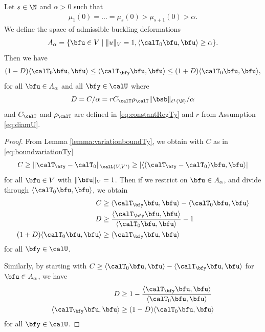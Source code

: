 \begin{lemma}\label{lemma:equivalenceTy}
    Let $ s \in \N$ and $\alpha > 0$ such that
    \begin{align*}
        \mu_1(0) = \ldots = \mu_s(0) > \mu_{s+1}(0) > \alpha.
    \end{align*}
We define the space of admissible buckling deformations 
\begin{align*}
A_{\alpha} = \{\bfu \in V  \mid \| u \|_V = 1, \langle \calT_0 \bfu, \bfu \rangle  \geq \alpha \}.   
\end{align*}
Then we have
\begin{align*}
    (1 - D) \langle \calT_0 \bfu, \bfu \rangle  \leq  \langle \calT_{\bfy} \bfu, \bfu \rangle  \leq  (1 + D) \langle \calT_0 \bfu, \bfu \rangle, 
\end{align*}
   for all $\bfu \in A_{\alpha}$ and all $\bfy \in \calU$ where 
   \begin{align}
   \label{eq:definitionD}
       D = C / \alpha = r C_{\calT} \rho_{\calT} \| \bsb \|_{\ell^1(\N)}/ \alpha 
   \end{align} and $C_{\calT} $ and $\rho_{\calT}$ are defined in \eqref{eq:constantRegTy} and $r$ from Assumption \eqref{eq:diamU}.
\end{lemma}
\begin{proof}
    From Lemma \ref{lemma:variationboundTy}, we obtain with $C$ as in \eqref{eq:boundvariationTy}
    \begin{align*}
        C \geq \| \calT_{\bfy} - \calT_0 \|_{\calL(V,V')} \geq \vert \langle (\calT_{\bfy} - \calT_0) \bfu, \bfu \rangle \vert
    \end{align*}
    for all $\bfu \in V$ with $ \| \bfu  \|_V = 1$.
    Then if we restrict on $\bfu \in A_\alpha$, and divide through $\langle \calT_0 \bfu, \bfu \rangle$, we obtain
    \begin{align*}
    C &\geq \langle \calT_\bfy \bfu, \bfu \rangle -  \langle \calT_0 \bfu, \bfu \rangle \\ 
       D  &\geq \frac{ \langle \calT_{\bfy} \bfu, \bfu \rangle}{\langle \calT_0 \bfu, \bfu \rangle} - 1  \\
    (1 + D) \langle \calT_0 \bfu, \bfu \rangle & \geq  \langle \calT_{\bfy} \bfu, \bfu \rangle
    \end{align*}
    for all $\bfy \in \calU$.

    Similarly, by starting with $C \geq  \langle \calT_0 \bfu, \bfu \rangle - \langle \calT_{\bfy} \bfu, \bfu \rangle $ for $\bfu \in A_\alpha$, we have 
    \begin{align*}
         D &\geq  1 -\frac{\langle \calT_{\bfy} \bfu, \bfu \rangle}{\langle \calT_0 \bfu, \bfu \rangle}  \\
        \langle \calT_{\bfy} \bfu, \bfu \rangle & \geq (1 -D )\langle \calT_0 \bfu, \bfu \rangle
    \end{align*}
    for all $\bfy \in \calU$.
    
\end{proof}


